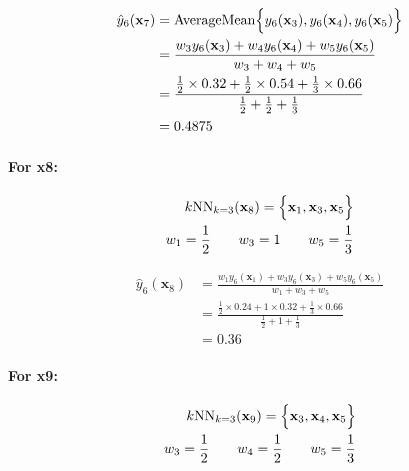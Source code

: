 \documentclass[12pt]{article}
\begin{document}
\begin{enumerate}[leftmargin=\labelsep]
\begin{enumerate}
        \begin{equation}
        \begin{split}
            \hat{y}_{6}(\mathbf{x}_7) &= \textrm{AverageMean}\Bigl\{ y_{6}(\mathbf{x}_3), y_{6}(\mathbf{x}_4), y_{6}(\mathbf{x}_5) \Bigr\} \\
            &= \frac{w_3y_{6}(\mathbf{x}_3) + w_4y_{6}(\mathbf{x}_4) + w_5y_{6}(\mathbf{x}_5)}{w_3 + w_4 + w_5} \\
            &= \frac{\frac{1}{2} \times 0.32 + \frac{1}{2} \times 0.54 + \frac{1}{3} \times 0.66}{\frac{1}{2} + \frac{1}{2} + \frac{1}{3}} \\
            &= 0.4875
        \end{split}
        \end{equation}

        \paragraph{For x8:}

        \begin{equation}
        \begin{split}
            k\textrm{NN}_{k = 3}(\mathbf{x}_8) = \Bigl\{ \mathbf{x}_1, \mathbf{x}_3, \mathbf{x}_5\Bigr\} \\
            w_1 = \frac{1}{2} \qquad w_3 = 1 \qquad w_5 = \frac{1}{3}
        \end{split}
        \end{equation}

        \begin{equation}
        \begin{split}
            \hat{y}_{6}(\mathbf{x}_8) &= \frac{w_1y_{6}(\mathbf{x}_1) + w_3y_{6}(\mathbf{x}_3) + w_5y_{6}(\mathbf{x}_5)}{w_1 + w_3 + w_5} \\
            &= \frac{\frac{1}{2} \times 0.24 + 1 \times 0.32 + \frac{1}{3} \times 0.66}{\frac{1}{2} + 1 + \frac{1}{3}} \\
            &= 0.36
        \end{split}
        \end{equation}

        \paragraph{For x9:}

        \begin{equation}
        \begin{split}
            k\textrm{NN}_{k = 3}(\mathbf{x}_9) = \Bigl\{ \mathbf{x}_3, \mathbf{x}_4, \mathbf{x}_5\Bigr\} \\
            w_3 = \frac{1}{2} \qquad w_4 = \frac{1}{2} \qquad w_5 = \frac{1}{3}
        \end{split}
        \end{equation}


\end{enumerate}
\end{enumerate}
\end{document}
